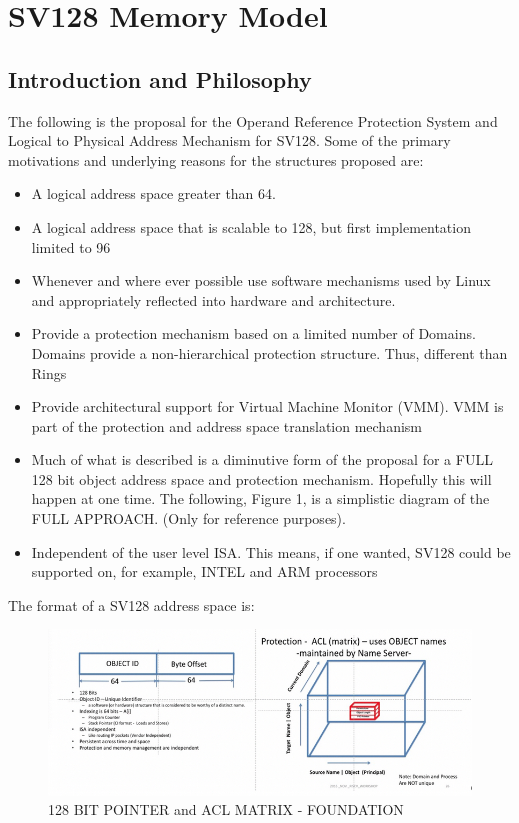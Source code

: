 \documentclass{article}
\begin{document}
\pagebreak



\clearpage
\section{SV128 Memory Model}
\label{sec:SV128MemoryModel}


\subsection{Introduction and Philosophy}

The following is the proposal for the Operand Reference Protection System and Logical to Physical Address Mechanism for SV128.  Some of the primary motivations and underlying reasons for the structures proposed are:


\begin{itemize}
\item A logical address space greater than 64. 
\item A logical address space that is scalable to 128,  but first implementation limited to 96
\item  Whenever and where ever possible use software mechanisms used by Linux and appropriately reflected into hardware and architecture.
\item  Provide a protection mechanism based on a limited number of Domains.  Domains provide a non-hierarchical protection structure. Thus, different than Rings
\item  Provide architectural support for Virtual Machine Monitor (VMM).  VMM is part of the protection and address space translation mechanism
\item  Much of what is described is a diminutive form of the proposal for a FULL 128 bit object address space and protection mechanism.  Hopefully this will happen at one time.   The following, Figure 1, is a  simplistic diagram of the FULL APPROACH. (Only for reference purposes).
\item  Independent of the user level ISA.  This means, if one wanted,  SV128 could be supported on, for example, INTEL and ARM processors
\end{itemize}

The format of a SV128 address space is:

\begin{figure}[h]
\includegraphics[scale = .5] 
{figures/figure1a.jpg}
\caption {128  BIT POINTER and ACL MATRIX  - FOUNDATION}
\end{figure}
\pagebreak
\end{document}
